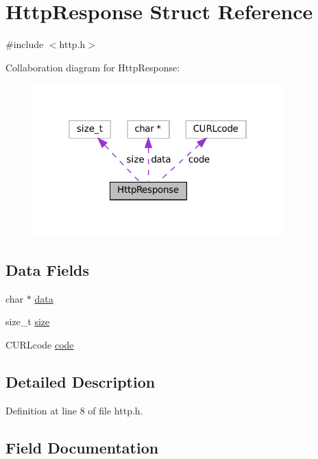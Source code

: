 \hypertarget{struct_http_response}{}\section{Http\+Response Struct Reference}
\label{struct_http_response}


{\ttfamily \#include $<$http.\+h$>$}



Collaboration diagram for Http\+Response\+:\nopagebreak
\begin{figure}[H]
\begin{center}
\leavevmode
\includegraphics[width=274pt]{struct_http_response__coll__graph}
\end{center}
\end{figure}
\subsection*{Data Fields}
\begin{DoxyCompactItemize}
\item 
char $\ast$ \mbox{\hyperlink{struct_http_response_a29b7ecfb11da1af6c7fdd3fe7862901f}{data}}
\item 
size\+\_\+t \mbox{\hyperlink{struct_http_response_a11b910682b365528a15fcfd6d4dd824f}{size}}
\item 
C\+U\+R\+Lcode \mbox{\hyperlink{struct_http_response_abce68ae6776a536dce762f0b6a96ab54}{code}}
\end{DoxyCompactItemize}


\subsection{Detailed Description}


Definition at line 8 of file http.\+h.



\subsection{Field Documentation}
\mbox{\label{struct_http_response_abce68ae6776a536dce762f0b6a96ab54}} 
